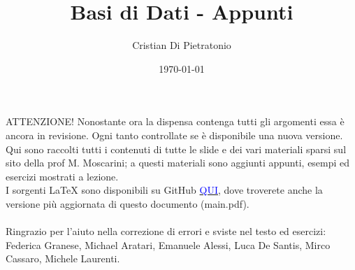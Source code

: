 \documentclass[a4paper,10pt]{article}
\title{\Huge Basi di Dati - Appunti}
\author{Cristian Di Pietratonio}
\date{\today}
\begin{document}
\maketitle

ATTENZIONE! Nonostante ora la dispensa contenga tutti gli argomenti essa è ancora in revisione.
Ogni tanto controllate se è disponibile una nuova versione.\\ 
Qui sono raccolti tutti i contenuti di tutte le slide e dei vari materiali sparsi sul sito della 
prof M. Moscarini; a questi materiali sono aggiunti appunti, esempi ed esercizi mostrati a lezione.\\ 
I sorgenti LaTeX sono disponibili su GitHub 
\href{https://github.com/Halolegend94/uni_database_appunti}{\textcolor{blue}{QUI}}, dove troverete 
anche la versione più aggiornata di questo documento (main.pdf).\\\\

Ringrazio per l'aiuto nella correzione di errori e sviste nel testo ed esercizi: Federica Granese, 
Michael Aratari, Emanuele Alessi, Luca De Santis, Mirco Cassaro, Michele Laurenti.



\newpage
\setcounter{tocdepth}{3}
\tableofcontents
\newpage

\newpage

\newpage

\newpage

\newpage

\newpage

\newpage

\end{document}
